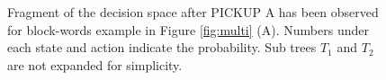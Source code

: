\documentclass[letterpaper]{article}
\theoremstyle{plain}
\begin{document}
\begin{figure}[tb]
\vspace{-5mm}        
        \caption{Fragment of the decision space after PICKUP A has been observed for block-words example in Figure \ref{fig:multi} (A). Numbers under each state and action indicate the probability. Sub trees $T_1$ and $T_2$ are not expanded for simplicity.}
        \label{fig:feature}
\vspace{-5mm}        
\end{figure} 
\end{document}
